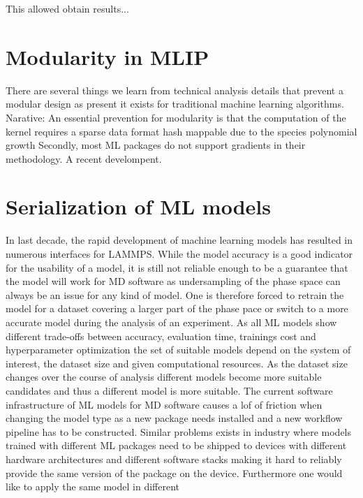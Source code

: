 This allowed obtain results...

\section{Modularity in MLIP}
There are several things we learn from technical analysis details that prevent a modular design as present it exists for traditional machine learning algorithms.
Narative:
An essential prevention for modularity is that the computation of the kernel requires a sparse data format hash mappable due to the species polynomial growth
Secondly, most ML packages do not support gradients in their methodology.
A recent develompent.


\section{Serialization of ML models}
In last decade, the rapid development of machine learning models has resulted in numerous interfaces for LAMMPS\cite{TODO}.
While the model accuracy is a good indicator for the usability of a model, it is still not reliable enough to be a guarantee that the model will work for MD software as undersampling of the phase space can always be an issue for any kind of model.
One is therefore forced to retrain the model for a dataset covering a larger part of the phase pace or switch to a more accurate model during the analysis of an experiment.
As all ML models show different trade-offs between accuracy, evaluation time, trainings cost and hyperparameter optimization the set of suitable models depend on the system of interest, the dataset size and given computational resources.
As the dataset size changes over the course of analysis different models become more suitable candidates and thus a different model is more suitable.
The current software infrastructure of ML models for MD software causes a lof of friction when changing the model type as a new package needs installed and a new workflow pipeline has to be constructed.
Similar problems exists in industry where models trained with different ML packages need to be shipped to devices with different hardware architectures and different software stacks making it hard to reliably provide the same version of the package on the device.
Furthermore one would like to apply the same model in different

